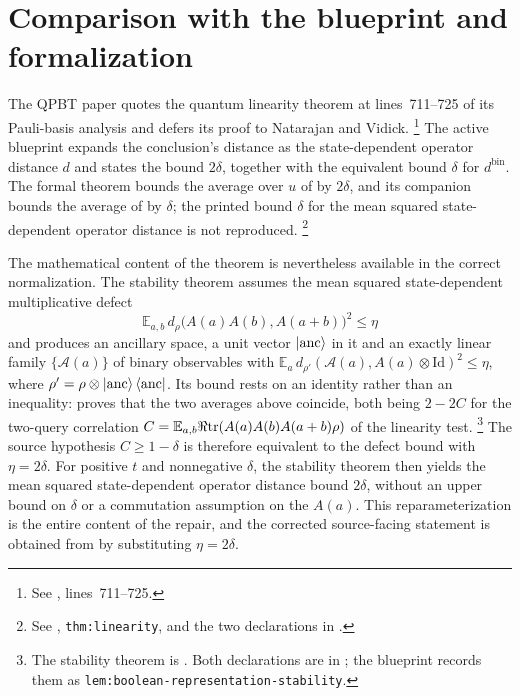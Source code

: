 \documentclass[11pt]{article}
\newcommand{\dbin}{d^{\mathrm{bin}}}
\newcommand{\Id}{\mathrm{Id}}
\begin{document}
\section{Comparison with the blueprint and formalization}

The QPBT paper quotes the quantum linearity theorem at lines~711--725 of its
Pauli-basis analysis and defers its proof to Natarajan and Vidick.%
\footnote{See
,
lines~711--725.}
The active blueprint expands the conclusion's distance as the state-dependent
operator distance $d$ and states the bound $2\delta$, together with the
equivalent bound $\delta$ for $\dbin$.  The formal theorem
 bounds the average over $u$
of  by $2\delta$, and its companion
bounds the average of  by $\delta$; the
printed bound $\delta$ for the mean squared state-dependent operator
distance is not reproduced.%
\footnote{See
,
\texttt{thm:linearity}, and
the two declarations in
.}

The mathematical content of the theorem is nevertheless available in the
correct normalization. The stability theorem assumes the mean squared
state-dependent multiplicative defect
\[
  \mathbb E_{a,b}\, d_\rho\big(A(a)A(b), A(a+b)\big)^2 \le \eta
\]
and produces an ancillary space, a unit vector $\ket{\mathrm{anc}}$ in it and
an exactly linear family $\{\mathcal A(a)\}$ of binary observables with
$\mathbb E_a\, d_{\rho'}(\mathcal A(a), A(a)\otimes\Id)^2 \le \eta$, where
$\rho' = \rho \otimes \ket{\mathrm{anc}}\bra{\mathrm{anc}}$.
Its bound rests on an identity rather than an inequality:
proves that the two averages above coincide, both being $2-2C$ for the
two-query correlation
$C = \mathbb E_{a,b}\Re\mathrm{tr}(A(a)A(b)A(a+b)\rho)$ of the linearity test.%
\footnote{The stability theorem is
. Both declarations are in
; the blueprint
records them as \texttt{lem:boolean-representation-stability}.}
The source hypothesis $C \ge 1-\delta$ is therefore equivalent to the defect
bound with $\eta = 2\delta$. For positive $t$ and nonnegative $\delta$, the
stability theorem then yields the mean squared state-dependent operator
distance bound $2\delta$, without an upper bound on $\delta$ or a commutation
assumption on the $A(a)$. This reparameterization is the entire
content of the repair, and the corrected source-facing statement
 is obtained from
 by substituting
$\eta = 2\delta$.
\end{document}
